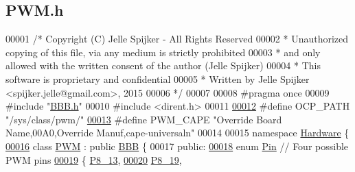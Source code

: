 \hypertarget{_p_w_m_8h_source}{}\subsection{P\+W\+M.\+h}
\label{_p_w_m_8h_source}

\begin{DoxyCode}
00001 \textcolor{comment}{/* Copyright (C) Jelle Spijker - All Rights Reserved}
00002 \textcolor{comment}{ * Unauthorized copying of this file, via any medium is strictly prohibited}
00003 \textcolor{comment}{ * and only allowed with the written consent of the author (Jelle Spijker)}
00004 \textcolor{comment}{ * This software is proprietary and confidential}
00005 \textcolor{comment}{ * Written by Jelle Spijker <spijker.jelle@gmail.com>, 2015}
00006 \textcolor{comment}{ */}
00007 
00008 \textcolor{preprocessor}{#pragma once}
00009 \textcolor{preprocessor}{#include "\hyperlink{_b_b_b_8h}{BBB.h}"}
00010 \textcolor{preprocessor}{#include <dirent.h>}
00011 
\hypertarget{_p_w_m_8h_source_l00012}{}\hyperlink{_p_w_m_8h_ac59f8e6888c0a1e33c63203c7b39126c}{00012} \textcolor{preprocessor}{#define OCP\_PATH "/sys/class/pwm/"}
\hypertarget{_p_w_m_8h_source_l00013}{}\hyperlink{_p_w_m_8h_a107564a7febd186a238d8af86893ca9b}{00013} \textcolor{preprocessor}{#define PWM\_CAPE "Override Board Name,00A0,Override Manuf,cape-universaln"}
00014 
00015 \textcolor{keyword}{namespace }\hyperlink{namespace_hardware}{Hardware} \{
\hypertarget{_p_w_m_8h_source_l00016}{}\hyperlink{class_hardware_1_1_p_w_m}{00016} \textcolor{keyword}{class }\hyperlink{class_hardware_1_1_p_w_m}{PWM} : \textcolor{keyword}{public} \hyperlink{class_hardware_1_1_b_b_b}{BBB} \{
00017 \textcolor{keyword}{public}:
\hypertarget{_p_w_m_8h_source_l00018}{}\hyperlink{class_hardware_1_1_p_w_m_a7cc6acf1c28f0eaef16246635dc0353a}{00018}   \textcolor{keyword}{enum} \hyperlink{class_hardware_1_1_p_w_m_a7cc6acf1c28f0eaef16246635dc0353a}{Pin} \textcolor{comment}{// Four possible PWM pins}
\hypertarget{_p_w_m_8h_source_l00019}{}\hyperlink{class_hardware_1_1_p_w_m_a7cc6acf1c28f0eaef16246635dc0353aa234e15810d56fe4504c4919b13990253}{00019}   \{ \hyperlink{class_hardware_1_1_p_w_m_a7cc6acf1c28f0eaef16246635dc0353aa234e15810d56fe4504c4919b13990253}{P8\_13},
\hypertarget{_p_w_m_8h_source_l00020}{}\hyperlink{class_hardware_1_1_p_w_m_a7cc6acf1c28f0eaef16246635dc0353aa98fe034e126bc72885936dec175841d2}{00020}     \hyperlink{class_hardware_1_1_p_w_m_a7cc6acf1c28f0eaef16246635dc0353aa98fe034e126bc72885936dec175841d2}{P8\_19},

\end{DoxyCode}
